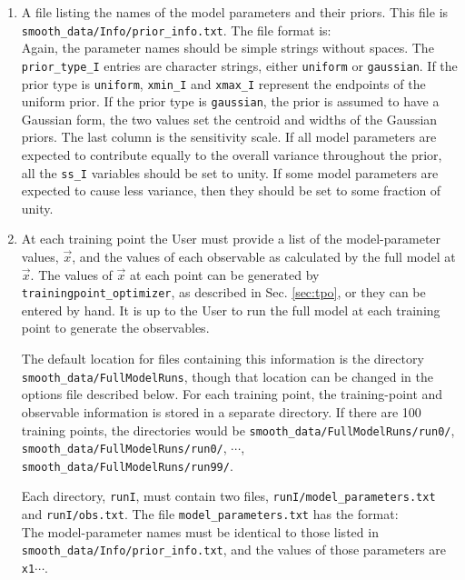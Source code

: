 \documentclass[UserManual.tex]{subfiles}
\begin{document}
\begin{sloppypar}
\begin{enumerate}
\item A file listing the names of the model parameters and their priors. This file is {\tt smooth\_data/Info/prior\_info.txt}. The file format is:\\
\vspace*{-8pt}{\tt \begin{Verbatim}[commandchars=\\\{\}]
   parameter_name_1  prior_type_1 xmin_1/centroid_1  xmax_1/Rgauss_1  ss_1
   parameter_name_2  prior_type_2 xmin_2/centroid_2  xmin_2/Rgauss_2  ss_2
   .
   parameter_name_N  prior_type_N xmin_N/centroid_N  xmin_N/Rgauss_N  ss_N
\end{Verbatim}
}\vspace*{-8pt}
Again, the parameter names should be simple strings without spaces. The {\tt prior\_type\_I} entries are character strings, either {\tt uniform} or {\tt gaussian}. If the prior type is {\tt uniform}, {\tt xmin\_I} and {\tt xmax\_I} represent the endpoints of the uniform prior. If the prior type is {\tt gaussian}, the prior is assumed to have a Gaussian form, the two values set the centroid and widths of the Gaussian priors. The last column is the sensitivity scale. If all model parameters are expected to contribute equally to the overall variance throughout the prior, all the {\tt ss\_I} variables should be set to unity. If some model parameters are expected to cause less variance, then they should be set to some fraction of unity. 

\item At each training point the User must provide a list of the model-parameter values, $\vec{x}$, and the values of each observable as calculated by the full model at $\vec{x}$. The values of $\vec{x}$ at each point can be generated by {\tt trainingpoint\_optimizer}, as described in Sec. \ref{sec:tpo}, or they can be entered by hand. It is up to the User to run the full model at each training point to generate the observables.

The default location for files containing this information is the directory {\tt smooth\_data/FullModelRuns}, though that location can be changed in the options file described below. For each training point, the training-point and observable information is stored in a separate directory. If there are 100 training points, the directories would be {\tt smooth\_data/FullModelRuns/run0/}, {\tt smooth\_data/FullModelRuns/run0/}, $\cdots$, {\tt smooth\_data/FullModelRuns/run99/}.

Each directory, {\tt runI}, must contain two files, {\tt runI/model\_parameters.txt} and {\tt runI/obs.txt}. The file {\tt model\_parameters.txt} has the format:\\ 
\vspace*{-8pt}{\tt \begin{Verbatim}[commandchars=\\\{\}]
parameter_name_1 x1  
parameter_name_2 x2  
.
\end{Verbatim}
}\vspace*{-8pt}
The model-parameter names must be identical to those listed in {\tt smooth\_data/Info/prior\_info.txt}, and the values of those parameters are {\tt x1}$\cdots$.


\end{enumerate}
\end{sloppypar}
\end{document}
